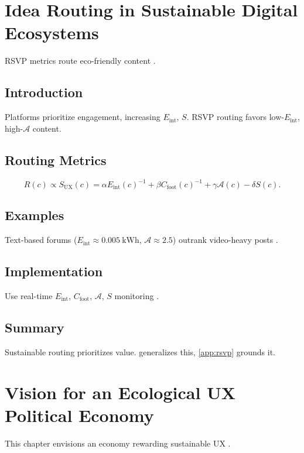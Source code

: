 \documentclass[openany]{book}
\newcommand{\Sent}{S} %
\newcommand{\Eint}{E_{\mathrm{int}}} %
\newcommand{\Cfoot}{C_{\mathrm{foot}}} %
\newcommand{\Auton}{\mathcal{A}} %
\newcommand{\SUX}{S_{\mathrm{UX}}} %
\newcommand{\kWh}{\mathrm{kWh}}
\begin{document}
{{\chapter{Idea Routing in Sustainable Digital Ecosystems}
\label{ch:routing}

RSVP metrics route eco-friendly content \citep{doctorow2022,designlab2024}.

\section{Introduction}
\label{sec:routing-intro}
Platforms prioritize engagement, increasing \(\Eint\), \(\Sent\). RSVP routing favors low-\(\Eint\), high-\(\Auton\) content.

\section{Routing Metrics}
\label{sec:routing-metrics}
\begin{equation}
\label{eq:routing}
R(c) \propto \SUX(c) = \alpha \Eint(c)^{-1} + \beta \Cfoot(c)^{-1} + \gamma \Auton(c) - \delta \Sent(c).
\end{equation}

\section{Examples}
\label{sec:routing-examples}
Text-based forums (\(\Eint \approx \SI{0.005}{\kWh}\), \(\Auton \approx 2.5\)) outrank video-heavy posts \citep{doctorow2022}.

\section{Implementation}
\label{sec:routing-impl}
Use real-time \(\Eint\), \(\Cfoot\), \(\Auton\), \(\Sent\) monitoring \citep{ch:principles}.

\section{Summary}
Sustainable routing prioritizes value.  generalizes this, \cref{app:rsvp} grounds it.

\chapter{Vision for an Ecological UX Political Economy}
\label{ch:vision}

This chapter envisions an economy rewarding sustainable UX \citep{colak2024,doctorow2022}.

}}
\end{document}
